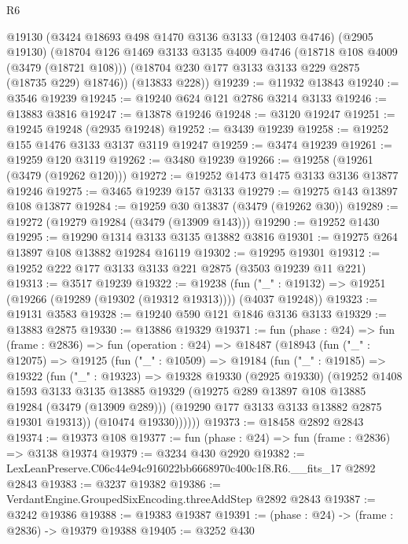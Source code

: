 \begin{lexlean}{R6}
\begin{coremodule}
    @19130
    (@3424
      @18693
      @498
      @1470
      @3136
      @3133
      (@12403 @4746)
      (@2905 @19130)
      (@18704
        @126
        @1469
        @3133
        @3135
        @4009
        @4746
        (@18718 @108 @4009 (@3479 (@18721 @108)))
        (@18704 @230 @177 @3133 @3133 @229 @2875 (@18735 @229) @18746))
      (@13833 @228))
@19239 := @11932 @13843
@19240 := @3546 @19239
@19245 := @19240 @624 @121 @2786 @3214 @3133
@19246 := @13883 @3816
@19247 := @13878 @19246
@19248 := @3120 @19247
@19251 := @19245 @19248 (@2935 @19248)
@19252 := @3439 @19239
@19258 := @19252 @155 @1476 @3133 @3137 @3119 @19247
@19259 := @3474 @19239
@19261 := @19259 @120 @3119
@19262 := @3480 @19239
@19266 := @19258 (@19261 (@3479 (@19262 @120)))
@19272 := @19252 @1473 @1475 @3133 @3136 @13877 @19246
@19275 := @3465 @19239 @157 @3133
@19279 := @19275 @143 @13897 @108 @13877
@19284 := @19259 @30 @13837 (@3479 (@19262 @30))
@19289 := @19272 (@19279 @19284 (@3479 (@13909 @143)))
@19290 := @19252 @1430
@19295 := @19290 @1314 @3133 @3135 @13882 @3816
@19301 := @19275 @264 @13897 @108 @13882 @19284 @16119
@19302 := @19295 @19301
@19312 := @19252 @222 @177 @3133 @3133 @221 @2875 (@3503 @19239 @11 @221)
@19313 := @3517 @19239
@19322 := @19238
    (fun ("_" : @19132) => @19251 (@19266 (@19289 (@19302 (@19312 @19313)))) (@4037 @19248))
@19323 := @19131 @3583
@19328 := @19240 @590 @121 @1846 @3136 @3133
@19329 := @13883 @2875
@19330 := @13886 @19329
@19371 := fun (phase : @24) =>
  fun (frame : @2836) =>
  fun (operation : @24) =>
  @18487
    (@18943
      (fun ("_" : @12075) =>
      @19125
        (fun ("_" : @10509) =>
        @19184
          (fun ("_" : @19185) =>
          @19322
            (fun ("_" : @19323) =>
            @19328
              @19330
              (@2925 @19330)
              (@19252
                @1408
                @1593
                @3133
                @3135
                @13885
                @19329
                (@19275 @289 @13897 @108 @13885 @19284 (@3479 (@13909 @289)))
                (@19290 @177 @3133 @3133 @13882 @2875 @19301 @19313))
              (@10474 @19330))))))
@19373 := @18458 @2892 @2843
@19374 := @19373 @108
@19377 := fun (phase : @24) => fun (frame : @2836) => @3138 @19374
@19379 := @3234 @430 @2920
@19382 := LexLeanPreserve.C06c44e94c916022bb6668970c400c1f8.R6.__fits_17 @2892 @2843
@19383 := @3237 @19382
@19386 := VerdantEngine.GroupedSixEncoding.threeAddStep @2892 @2843
@19387 := @3242 @19386
@19388 := @19383 @19387
@19391 := (phase : @24) -> (frame : @2836) -> @19379 @19388
@19405 := @3252
    @430

\end{coremodule}
\end{lexlean}
